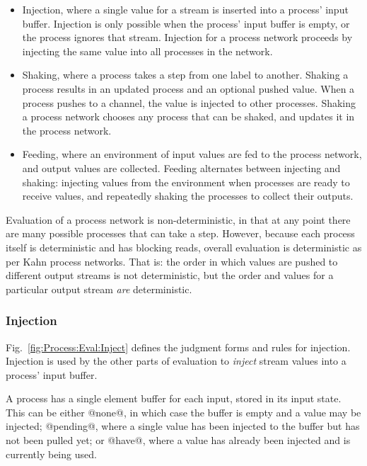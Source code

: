 \begin{itemize}
\item Injection, where a single value for a stream is inserted into a process' input buffer.
Injection is only possible when the process' input buffer is empty, or the process ignores that stream.
Injection for a process network proceeds by injecting the same value into all processes in the network.

\item Shaking, where a process takes a step from one label to another.
Shaking a process results in an updated process and an optional pushed value.
When a process pushes to a channel, the value is injected to other processes.
Shaking a process network chooses any process that can be shaked, and updates it in the process network.

\item Feeding, where an environment of input values are fed to the process network, and output values are collected.
Feeding alternates between injecting and shaking: injecting values from the environment when processes are ready to receive values, and repeatedly shaking the processes to collect their outputs.
\end{itemize}

Evaluation of a process network is non-deterministic, in that at any point there are many possible processes that can take a step.
However, because each process itself is deterministic and has blocking reads, overall evaluation is deterministic as per Kahn process networks.
That is: the order in which values are pushed to different output streams is not deterministic, but the order and values for a particular output stream \emph{are} deterministic.



\subsubsection{Injection}
Fig.~\ref{fig:Process:Eval:Inject} defines the judgment forms and rules for injection.
Injection is used by the other parts of evaluation to \emph{inject} stream values into a process' input buffer.

A process has a single element buffer for each input, stored in its input state.
This can be either @none@, in which case the buffer is empty and a value may be injected; @pending@, where a single value has been injected to the buffer but has not been pulled yet; or @have@, where a value has already been injected and is currently being used.

